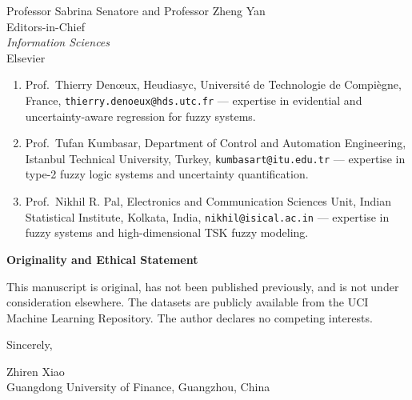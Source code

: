 \documentclass[11pt]{letter}
\begin{document}
\begin{letter}{Professor Sabrina Senatore and Professor Zheng Yan \\ Editors-in-Chief \\ \textit{Information Sciences} \\ Elsevier}
\begin{enumerate}
\item Prof.\ Thierry Den\oe ux, Heudiasyc, Universit\'e de Technologie de Compi\`egne, France, \texttt{thierry.denoeux@hds.utc.fr} --- expertise in evidential and uncertainty-aware regression for fuzzy systems.
\item Prof.\ Tufan Kumbasar, Department of Control and Automation Engineering, Istanbul Technical University, Turkey, \texttt{kumbasart@itu.edu.tr} --- expertise in type-2 fuzzy logic systems and uncertainty quantification.
\item Prof.\ Nikhil R. Pal, Electronics and Communication Sciences Unit, Indian Statistical Institute, Kolkata, India, \texttt{nikhil@isical.ac.in} --- expertise in fuzzy systems and high-dimensional TSK fuzzy modeling.
\end{enumerate}

\noindent\textbf{Originality and Ethical Statement}

This manuscript is original, has not been published previously, and is not under consideration elsewhere. The datasets are publicly available from the UCI Machine Learning Repository. The author declares no competing interests.

\closing{Sincerely,}

Zhiren Xiao \\
Guangdong University of Finance, Guangzhou, China

\end{letter}
\end{document}
